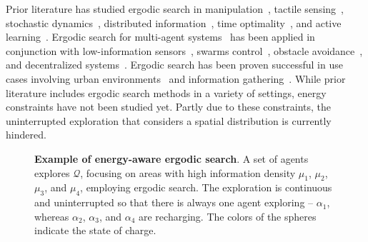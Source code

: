 \documentclass[letterpaper,10pt,conference,twoside]{IEEEtran}
\theoremstyle{definition}
\begin{document}
Prior literature has studied ergodic search in manipulation~\cite{shetty2022ergodic}, tactile sensing~\cite{abraham2017ergodic}, stochastic dynamics~\cite{ayvali2017ergodic,torre2016ergodic}, distributed information~\cite{miller2016ergodic}, time optimality~\cite{dong2023time}, and active learning~\cite{abraham2021ergodic}. Ergodic search for multi-agent systems~\cite{prabhakar2020ergodic,coffin2022multi} has been applied in conjunction with low-information sensors~\cite{coffin2022multi,lerch2023safety,abraham2018decentralized}, swarms control~\cite{prabhakar2020ergodic}, obstacle avoidance~\cite{lerch2023safety}, and decentralized systems~\cite{abraham2018decentralized}. Ergodic search has been proven successful in use cases involving urban environments~\cite{patel2021multi} and information gathering~\cite{dressel2018optimality}.
While prior literature includes ergodic search methods in a variety of settings, energy constraints have not been studied yet. 
Partly due to these constraints, the uninterrupted exploration %
that %
considers a spatial distribution is currently hindered. 

\begin{figure}[t!]
  \centering
  \vspace*{-.1cm}
  
  \caption{\textbf{Example of energy-aware ergodic search}. A set of agents explores $\mathcal{Q}$, focusing on areas with high information density $\mu_1$, $\mu_2$, $\mu_3$, and $\mu_4$, employing ergodic search. The exploration is continuous and uninterrupted %
  so that there is always one agent exploring -- $\alpha_1$, whereas $\alpha_2$, $\alpha_3$, and $\alpha_4$ are recharging. The colors of the spheres indicate the state of charge.}
  \label{fig:abs}
  \vspace*{-.4cm}
\end{figure}
\end{document}

